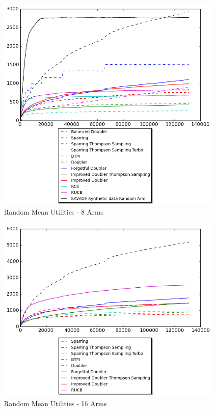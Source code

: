 \documentclass[MSc,beforeExam]{iitcsthesis}
\begin{document}
\begin{figure}[h!]
\centering
  \includegraphics[scale=0.8]{graphs/random_data_8.png}
  \caption{Random Mean Utilities - 8 Arms}
\end{figure}
\newpage
\begin{figure}[h!]
\centering
  \includegraphics[scale=0.8]{graphs/random_data_16.png}
  \caption{Random Mean Utilities - 16 Arms}
\end{figure}
\end{document}
